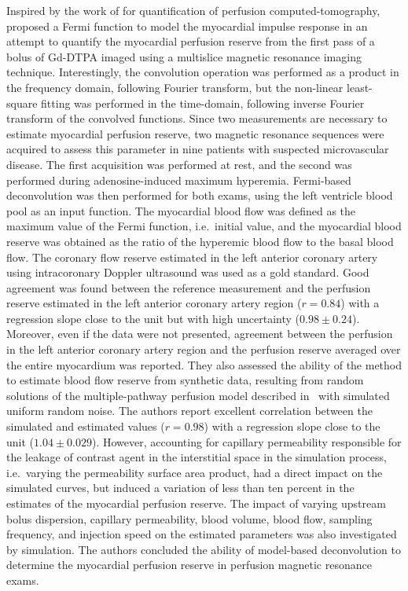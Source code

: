 Inspired by the work of \citet{Axel:1982wu} for quantification of perfusion computed-tomography, \citet{JeroschHerold:1998gg} proposed a Fermi function to model the myocardial impulse response in an attempt to quantify the myocardial perfusion reserve from the first pass of a bolus of Gd-DTPA imaged using a multislice magnetic resonance imaging technique.
Interestingly, the convolution operation was performed as a product in the frequency domain, following Fourier transform, but the non-linear least-square fitting was performed in the time-domain, following inverse Fourier transform of the convolved functions.
Since two measurements are necessary to estimate myocardial perfusion reserve, two magnetic resonance sequences were acquired to assess this parameter in nine patients with suspected microvascular disease.
The first acquisition was performed at rest, and the second was performed during adenosine-induced maximum hyperemia.
Fermi-based deconvolution was then performed for both exams, using the left ventricle blood pool as an input function.
The myocardial blood flow was defined as the maximum value of the Fermi function, i.e.~initial value, and the myocardial blood reserve was obtained as the ratio of the hyperemic blood flow to the basal blood flow.
The coronary flow reserve estimated in the left anterior coronary artery using intracoronary Doppler ultrasound was used as a gold standard. 
Good agreement was found between the reference measurement and the perfusion reserve estimated in the left anterior coronary artery region ($r = 0.84$) with a regression slope close to the unit but with high uncertainty ($0.98 \pm 0.24$).
Moreover, even if the data were not presented, agreement between the perfusion in the left anterior coronary artery region and the perfusion reserve averaged over the entire myocardium was reported.
They also assessed the ability of the method to estimate blood flow reserve from synthetic data, resulting from random solutions of the multiple-pathway perfusion model described in~\cite{Kroll:1996vz} with simulated uniform random noise. 
The authors report excellent correlation between the simulated and estimated values ($r = 0.98$) with a regression slope close to the unit ($1.04 \pm 0.029$).
However, accounting for capillary permeability responsible for the leakage of contrast agent in the interstitial space in the simulation process, i.e.~varying the permeability surface area product, had a direct impact on the simulated curves, but induced a variation of less than ten percent in the estimates of the myocardial perfusion reserve.
The impact of varying upstream bolus dispersion, capillary permeability, blood volume, blood flow, sampling frequency, and injection speed on the estimated parameters was also investigated by simulation.
The authors concluded the ability of model-based deconvolution to determine the myocardial perfusion reserve in perfusion magnetic resonance exams.


